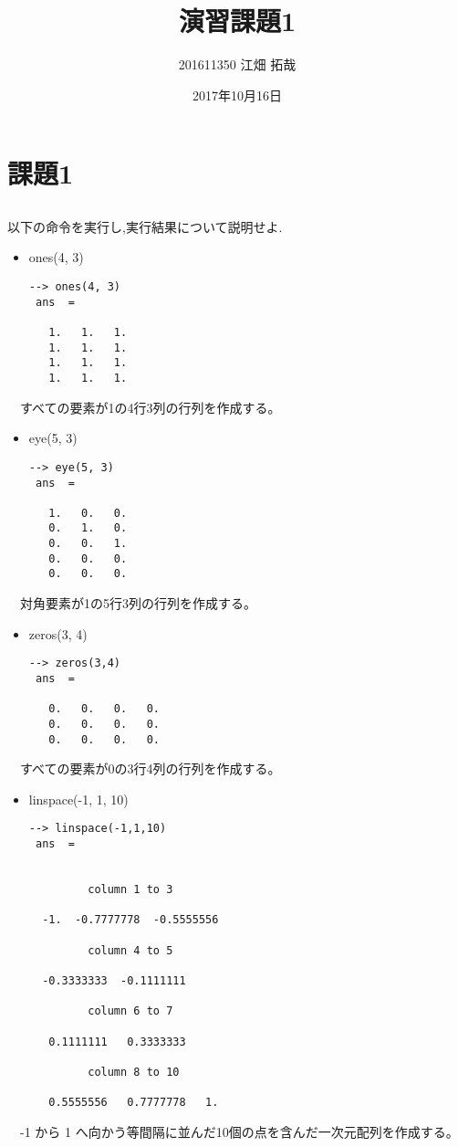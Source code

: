 \documentclass[a4j, 11pt]{jarticle}
\author{201611350 江畑 拓哉}
\date{2017年10月16日}
\title{演習課題1}
\begin{document}
\section{課題1}
\label{sec:org1fc4f40}
\subsection{}
\label{sec:orgc44cb96}
以下の命令を実行し,実行結果について説明せよ.\\
\begin{itemize}
\item ones(4, 3)\\
\begin{verbatim}
--> ones(4, 3)
 ans  =

   1.   1.   1.
   1.   1.   1.
   1.   1.   1.
   1.   1.   1.
\end{verbatim}
\end{itemize}
　すべての要素が1の4行3列の行列を作成する。\\
\begin{itemize}
\item eye(5, 3)\\
\begin{verbatim}
--> eye(5, 3)
 ans  =

   1.   0.   0.
   0.   1.   0.
   0.   0.   1.
   0.   0.   0.
   0.   0.   0.
\end{verbatim}
\end{itemize}
　対角要素が1の5行3列の行列を作成する。\\
\begin{itemize}
\item zeros(3, 4)\\
\begin{verbatim}
--> zeros(3,4)
 ans  =

   0.   0.   0.   0.
   0.   0.   0.   0.
   0.   0.   0.   0.
\end{verbatim}
\end{itemize}
　すべての要素が0の3行4列の行列を作成する。\\
\begin{itemize}
\item linspace(-1, 1, 10)\\
\begin{verbatim}
--> linspace(-1,1,10)
 ans  =


         column 1 to 3

  -1.  -0.7777778  -0.5555556

         column 4 to 5

  -0.3333333  -0.1111111

         column 6 to 7

   0.1111111   0.3333333

         column 8 to 10

   0.5555556   0.7777778   1.
\end{verbatim}
\end{itemize}
　-1 から 1 へ向かう等間隔に並んだ10個の点を含んだ一次元配列を作成する。\\
\end{document}

